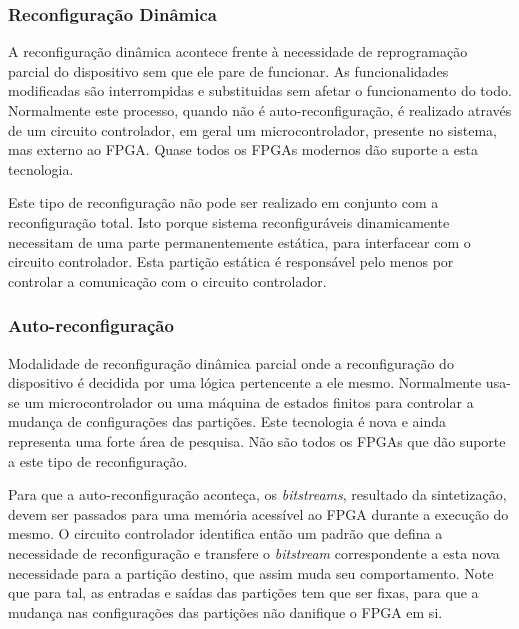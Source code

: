 \documentclass[11pt,a4paper,oneside]{book}
\begin{document}
\subsubsection{Reconfigura\c{c}\~ao Din\^amica}
A reconfigura\c{c}\~ao din\^amica acontece frente \`a necessidade de reprograma\c{c}\~ao parcial do dispositivo sem que ele pare de funcionar.
As funcionalidades modificadas s\~ao interrompidas e substituidas sem afetar o funcionamento do todo.
Normalmente este processo, quando n\~ao \'e auto-reconfigura\c{c}\~ao, \'e realizado atrav\'es de um circuito controlador, em geral um microcontrolador, presente no sistema, mas externo ao FPGA.
Quase todos os FPGAs modernos d\~ao suporte a esta tecnologia.

Este tipo de reconfigura\c{c}\~ao n\~ao pode ser realizado em conjunto com a reconfigura\c{c}\~ao total.
Isto porque sistema reconfigur\'aveis dinamicamente necessitam de uma parte permanentemente est\'atica, para interfacear com o circuito controlador.
Esta parti\c{c}\~ao est\'atica \'e respons\'avel pelo menos por controlar a comunica\c{c}\~ao com o circuito controlador.

\subsubsection{Auto-reconfigura\c{c}\~ao}
Modalidade de reconfigura\c{c}\~ao din\^amica parcial onde a reconfigura\c{c}\~ao do dispositivo \'e decidida por uma l\'ogica pertencente a ele mesmo.
Normalmente usa-se um microcontrolador ou uma m\'aquina de estados finitos para controlar a mudan\c{c}a de configura\c{c}\~oes das parti\c{c}\~oes.
Este tecnologia \'e nova e ainda representa uma forte \'area de pesquisa.
N\~ao s\~ao todos os FPGAs que d\~ao suporte a este tipo de reconfigura\c{c}\~ao.

Para que a auto-reconfigura\c{c}\~ao aconte\c{c}a, os \textit{bitstreams}, resultado da sintetiza\c{c}\~ao, devem ser passados para uma mem\'oria acess\'i­vel ao FPGA durante a execu\c{c}\~ao do mesmo.
O circuito controlador identifica ent\~ao um padr\~ao que defina a necessidade de reconfigura\c{c}\~ao e transfere o \textit{bitstream} correspondente a esta nova necessidade para a parti\c{c}\~ao destino, que assim muda seu comportamento.
Note que para tal, as entradas e sa\'i­das das parti\c{c}\~oes tem que ser fixas, para que a mudan\c{c}a nas configura\c{c}\~oes das parti\c{c}\~oes n\~ao danifique o FPGA em si.

\end{document}

